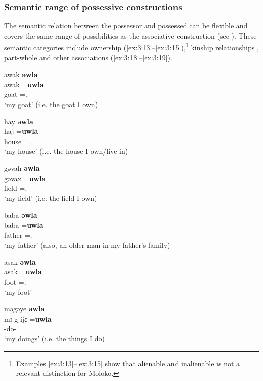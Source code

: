 \subsubsection{Semantic range of possessive constructions}\label{sec:3.1.2.1}

The semantic relation between the possessor and possessed can be flexible and covers the same range of possibilities as the associative construction (see ). These semantic categories include ownership (\ref{ex:3:13}--\ref{ex:3:15}),\footnote{Examples \ref{ex:3:13}--\ref{ex:3:15} show that alienable and inalienable is not a relevant distinction for Moloko.} kinship relationships , part-whole  and other associations (\ref{ex:3:18}--\ref{ex:3:19}).  

\ea \label{ex:3:13}
awak  \textbf{əwla}\\
\gll  awak =\textbf{uwla}\\
      goat    ={\oneS}.{\POSS}\\
\glt  ‘my goat’ (i.e. the goat I own)
\z

\ea \label{ex:3:14}
hay   \textbf{əwla}\\
\gll  haj     =\textbf{uwla}\\
      house  ={\oneS}.{\POSS}\\
\glt  ‘my house’ (i.e. the house I own/live in)
\z

\ea \label{ex:3:15}
gəvah  \textbf{əwla}\\
\gll  gəvax  =\textbf{uwla}\\
      field  ={\oneS}.{\POSS}\\
\glt  ‘my field’ (i.e. the field I own)
\z

\ea \label{ex:3:16}
baba  \textbf{əwla}\\
\gll  baba   =\textbf{uwla}\\
      father  ={\oneS}.{\POSS}\\
\glt  ‘my father’ (also, an older man in my father’s family)
\z

\ea \label{ex:3:17}
asak  \textbf{əwla}\\
\gll  asak   =\textbf{uwla}\\
      foot    ={\oneS}.{\POSS}\\
\glt  ‘my foot’ 
\z

\ea \label{ex:3:18}
məgəye  \textbf{əwla}\\
\gll  mɪ-g-ijɛ   =\textbf{uwla}\\
      {\NOM}{}-do-{\CL}  ={\oneS}.{\POSS}\\
\glt  ‘my doings’ (i.e. the things I do)
\z

